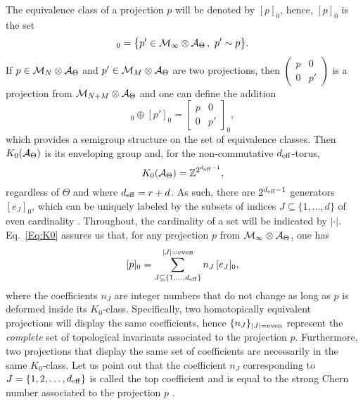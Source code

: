 \documentclass[
    aps,
    prb,
    twocolumn,
    floatfix,
    superscriptaddress,
	10pt
]{revtex4-2}
\begin{document}
The equivalence class of a projection $p$ will be denoted by $[p]_0$, hence, $[p]_0$ is the set
\begin{equation}
[p]_0= \big \{p' \in \Mm_\infty \otimes \Aa_\Theta \, ,  \ p' \sim p \big \}.
\end{equation}
If $p \in {\mathcal M}_N \otimes {\mathcal A}_\Theta$ and $p' \in {\mathcal M}_M \otimes {\mathcal A}_\Theta$ are two projections, then $\begin{pmatrix} p & 0 \\ 0 & p' \end{pmatrix}$ is a projection from ${\mathcal M}_{N+M} \otimes {\mathcal A}_\Theta$ and one can define the addition
\begin{equation}
[p]_0 \oplus [p']_0 = \left [ \begin{matrix} p & 0 \\ 0 & p' \end{matrix} \right ]_0,
\end{equation}
which provides a semigroup structure on the set of equivalence classes. Then $K_0({\mathcal A}_\Theta)$ is its  enveloping group  \cite{Blackadar1998} and, for the non-commutative ${d_\mathrm{eff}}$-torus,
\begin{equation}\label{Eq:K0} 
K_0({\mathcal A}_\Theta) = {\mathbb Z}^{2^{{d_\mathrm{eff}}-1}},
\end{equation}
regardless of $\Theta$ and where ${d_\mathrm{eff}} = r+d$.
As such, there are $2^{{d_\mathrm{eff}}-1}$ generators $[e_J]_0$, which can be uniquely labeled by the subsets of indices $J \subseteq \{1,\ldots,d\}$ of even cardinality \cite{Prodan2016}. 
Throughout, the cardinality of a set will be indicated by $|\cdot |$. Eq.~\eqref{Eq:K0} assures us that, for any projection $p$ from ${\mathcal M}_\infty \otimes {\mathcal A}_\Theta$, one has
\begin{equation}\label{Eq-GenExpansion}
[p]_0  = \sum_{J \subseteq \{1,\ldots,{d_\mathrm{eff}} \}}^{|J|={\rm even}} n_J \, [e_J]_0, 
\end{equation} 
where the coefficients $n_J$ are integer numbers that do not change as long as $p$ is deformed inside its $K_0$-class. Specifically, two homotopically equivalent projections will display the same coefficients, hence $\{n_J\}_{|J|={\rm even}}$ represent the {\it complete} set of topological invariants associated to the projection $p$. Furthermore, two projections that display the same set of coefficients are necessarily in the same $K_0$-class. Let us point out that the coefficient $n_J$ corresponding to $J=\{1,2,\ldots,{d_\mathrm{eff}} \}$ is called the top coefficient and is equal to the strong Chern number associated to the projection $p$ \cite[Sec.~5.7]{Prodan2016}.
\end{document}
